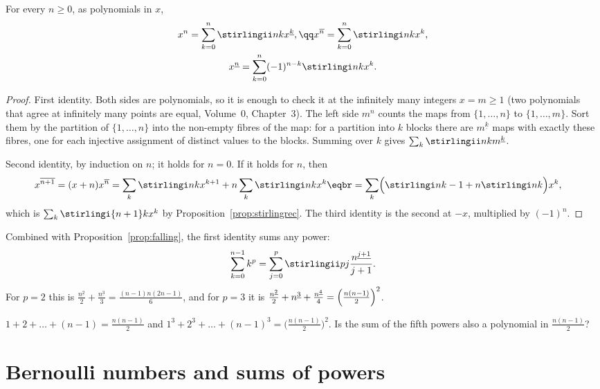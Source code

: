 \begin{theorem}\label{thm:stirling}
For every $n\ge0$, as polynomials in $x$,
\[
\begin{gathered}x^n=\sum_{k=0}^n\stirlingii nk x^{\underline k},\qq x^{\overline n}=\sum_{k=0}^n\stirlingi nk x^k,\\ x^{\underline n}=\sum_{k=0}^n(-1)^{n-k}\stirlingi nk x^k.\end{gathered}
\]
\end{theorem}
\begin{proof}
First identity. Both sides are polynomials, so it is enough to check it at the infinitely many integers $x=m\ge1$
(two polynomials that agree at infinitely many points are equal, Volume~0, Chapter~3). The left side $m^n$ counts the maps
from $\{1,\dots,n\}$ to $\{1,\dots,m\}$. Sort them by the partition of $\{1,\dots,n\}$ into the non-empty fibres of the
map: for a partition into $k$ blocks there are $m^{\underline k}$ maps with exactly these fibres, one for each injective
assignment of distinct values to the blocks. Summing over $k$ gives $\sum_k\stirlingii nk m^{\underline k}$.

Second identity, by induction on $n$; it holds for $n=0$. If it holds for $n$, then
\[
\begin{aligned}x^{\overline{n+1}}&=(x+n)x^{\overline n}=\sum_k\stirlingi nk x^{k+1}+n\sum_k\stirlingi nk x^k\eqbr=\sum_k\Bigl(\stirlingi n{k-1}+n\stirlingi nk\Bigr)x^k,\end{aligned}
\]
which is $\sum_k\stirlingi{n+1}k x^k$ by Proposition~\ref{prop:stirlingrec}. The third identity is the second at $-x$,
multiplied by $(-1)^n$.
\end{proof}

Combined with Proposition~\ref{prop:falling}, the first identity sums any power:
\[
\sum_{k=0}^{n-1}k^p=\sum_{j=0}^p\stirlingii pj\frac{n^{\underline{j+1}}}{j+1}.
\]
For $p=2$ this is $\frac{n^{\underline2}}2+\frac{n^{\underline3}}3=\frac{(n-1)n(2n-1)}6$, and for $p=3$ it is
$\frac{n^{\underline2}}2+n^{\underline3}+\frac{n^{\underline4}}4=\Bigl(\frac{n(n-1)}2\Bigr)^2$.

\begin{think}
$1+2+\dots+(n-1)=\frac{n(n-1)}2$ and $1^3+2^3+\dots+(n-1)^3=\bigl(\frac{n(n-1)}2\bigr)^2$. Is the sum of the fifth powers
also a polynomial in $\frac{n(n-1)}2$?
\end{think}

\section{Bernoulli numbers and sums of powers}

